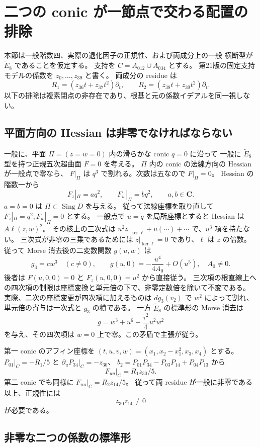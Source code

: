 \section{二つの conic が一節点で交わる配置の排除}

本節は一般階数四、実際の退化因子の正規性、および両成分上の一般
横断型が $\widetilde E_8$ であることを仮定する。
支持を $C=A_{012}\cup A_{034}$ とする。
第21版の固定支持モデルの係数を $z_0,\ldots,z_{39}$ と書く。
両成分の residue は
\[
R_1=(z_{36}t+z_{37}t^2)\partial_t,\qquad
R_2=(z_{38}t+z_{39}t^2)\partial_t.
\]
以下の排除は複素閉点の非存在であり、根基と元の係数イデアルを同一視しない。

\subsection{平面方向の Hessian は非零でなければならない}

一般に、平面 $\Pi=(z=w=0)$ 内の滑らかな conic $q=0$ に沿って
一般に $\widetilde E_8$ 型を持つ正規五次超曲面 $F=0$ を考える。
$\Pi$ 内の conic の法線方向の Hessian が一般点で零なら、
$F|_\Pi$ は $q^3$ で割れる。次数は五なので $F|_\Pi=0$。
Hessian の階数一から
\[
F_z|_\Pi=a q^2,\qquad F_w|_\Pi=b q^2,\qquad a,b\in\mathbf C.
\]
$a=b=0$ は $\Pi\subset\operatorname{Sing}D$ を与える。
従って法線座標を取り直して $F_z|_\Pi=q^2,F_w|_\Pi=0$ とする。
一般点で $u=q$ を局所座標とすると Hessian は $A\ell(z,w)^2$。
その核上の三次式は $u^2z|_{\ker\ell}+u(\cdots)+\cdots$ で、$u^3$ 項を持たない。
三次式が非零の三乗であるためには $z|_{\ker\ell}=0$ であり、$\ell$ は $z$ の倍数。
従って Morse 消去後の二変数関数 $g(u,w)$ は
\[
g_3=cw^3\quad(c\ne0),\qquad
g(u,0)=-\frac{u^4}{4A_0}+O(u^5),\quad A_0\ne0.
\]
後者は $F(u,0,0)=0$ と $F_z(u,0,0)=u^2$ から直接従う。
三次項の根直線上への四次項の制限は座標変換と単元倍の下で、非零定数倍を除いて不変である。
実際、二次の座標変更が四次項に加えるものは $dg_3(v_2)$ で $w^2$ によって割れ、
単元倍の寄与は一次式と $g_3$ の積である。
一方 $\widetilde E_8$ の標準形の Morse 消去は
\[
g=w^3+u^6-\frac{\tau^2}{4}u^2w^2
\]
を与え、その四次項は $w=0$ 上で零。この矛盾で主張が従う。

第一 conic のアフィン座標を
$(t,u,v,w)=(x_1,x_2-x_1^2,x_3,x_4)$ とする。
$P_{01}|_C=-R_1/5$ と $\partial_uP_{34}|_C=-z_{30}$、
$b_2=P_{01}P_{34}-P_{03}P_{14}+P_{04}P_{13}$ から
\[
F_{uu}|_C=R_1z_{30}/5.
\]
第二 conic でも同様に $F_{uu}|_C=R_2z_{14}/5$。
従って両 residue が一般に非零である以上、正規性には
\[
z_{30}z_{14}\ne0
\]
が必要である。

\subsection{非零な二つの係数の標準形}

